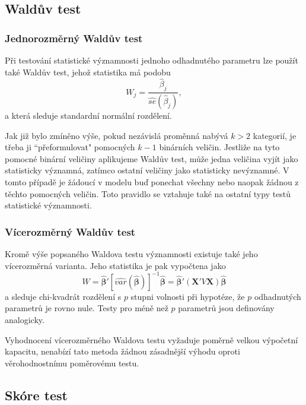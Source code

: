 \subsection{Waldův test}

\subsubsection{Jednorozměrný Waldův test}

Při testování statistické významnosti jednoho odhadnutého parametru lze použít také Waldův test, jehož statistika má podobu
\begin{equation}
W_j = \frac{\hat{\beta}_j}{\widehat{se}(\hat{\beta}_j)},
\end{equation}
a která sleduje standardní normální rozdělení.

Jak již bylo zmíněno výše, pokud nezávislá proměnná nabývá $k > 2$ kategorií, je třeba ji ``přeformulovat" pomocných $k - 1$ binárních veličin. Jestliže na tyto pomocné binární veličiny aplikujeme Waldův test, může jedna veličina vyjít jako statisticky významná, zatímco ostatní veličiny jako statisticky nevýznamné. V tomto případě je žádoucí v modelu buď ponechat všechny nebo naopak žádnou z těchto pomocných veličin. Toto pravidlo se vztahuje také na ostatní typy testů statistické významnosti.

\subsubsection{Vícerozměrný Waldův test}

Kromě výše popsaného Waldova testu významnosti existuje také jeho vícerozměrná varianta. Jeho statistika je pak vypočtena jako
\begin{equation}
W = \hat{\pmb{\beta}}' \left[\widehat{var}(\hat{\pmb{\beta}})\right]^{-1} \hat{\pmb{\beta}} = \hat{\pmb{\beta}}' (\pmb{X}' V \pmb{X}) \hat{\pmb{\beta}}
\end{equation}
a sleduje chi-kvadrát rozdělení s $p$ stupni volnosti při hypotéze, že $p$ odhadnutých parametrů je rovno nule. Testy pro méně než $p$ parametrů jsou definovány analogicky.

Vyhodnocení vícerozměrného Waldova testu vyžaduje poměrně velkou výpočetní kapacitu, nenabízí tato metoda žádnou zásadnější výhodu oproti věrohodnostnímu poměrovému testu.

\subsection{Skóre test}

